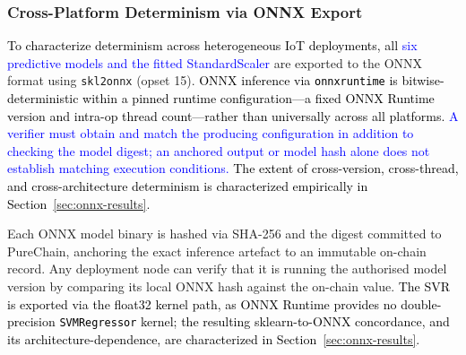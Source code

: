 \documentclass[conference]{IEEEtran}
\newcommand{\rev}[2]{\textcolor{blue}{#2}}
\begin{document}
\subsubsection{Cross-Platform Determinism via ONNX Export}
\label{sec:onnx}

\textcolor{black}{To characterize determinism across heterogeneous IoT
deployments, all \rev{R2.1}{six predictive models and the fitted StandardScaler}} are exported to the ONNX format using
\texttt{skl2onnx} (opset 15).
\textcolor{black}{ONNX inference via \texttt{onnxruntime} is
bitwise-deterministic within a pinned runtime configuration---a
fixed ONNX Runtime version and intra-op thread count---rather
than universally across all platforms. \rev{R1.1}{A verifier must
obtain and match the producing configuration in addition to
checking the model digest; an anchored output or model hash
alone does not establish matching execution conditions.}
The extent of cross-version, cross-thread, and
cross-architecture determinism is characterized empirically
in Section~\ref{sec:onnx-results}.}

Each ONNX model binary is hashed via SHA-256 and the digest
committed to PureChain, anchoring the exact inference
artefact to an immutable on-chain record.
Any deployment node can verify that it is running the
authorised model version by comparing its local ONNX hash
against the on-chain value.
\textcolor{black}{The SVR is exported via the float32 kernel path,
as ONNX Runtime provides no double-precision \texttt{SVMRegressor}
kernel; the resulting sklearn-to-ONNX concordance, and its
architecture-dependence, are characterized in
Section~\ref{sec:onnx-results}.}
\end{document}
